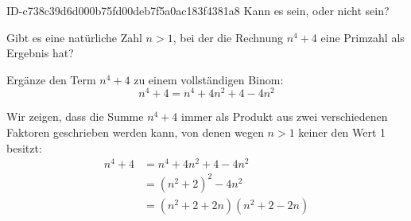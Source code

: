 \begin{exercise}
      {ID-c738c39d6d000b75fd00deb7f5a0ac183f4381a8}
      {Kann es sein, oder nicht sein?}
  \ifproblem\problem\par
    Gibt es eine natürliche Zahl $n>1$, bei der die Rechnung $n^{4}+4$ eine
    Primzahl als Ergebnis hat?
  \fi
  \ifoutline\outline\par
    Ergänze den Term $n^{4}+4$ zu einem vollständigen Binom:
    \begin{equation*}
      n^{4}+4=n^{4}+4n^{2}+4-4n^{2}
    \end{equation*}
  \fi
  \ifoutcome\outcome\par
    Wir zeigen, dass die Summe $n^{4}+4$ immer als Produkt aus
    zwei verschiedenen Faktoren geschrieben werden kann, von denen
    wegen $n>1$ keiner den Wert 1 besitzt:
    \begin{equation*}
      \begin{split}
        n^{4}+4&=n^{4}+4n^{2}+4-4n^{2}\\
               &=\left(n^{2}+2\right)^{2}-4n^{2}\\
               &=\left(n^{2}+2+2n\right)\left(n^{2}+2-2n\right)
      \end{split}
    \end{equation*}
  \fi
\end{exercise}
